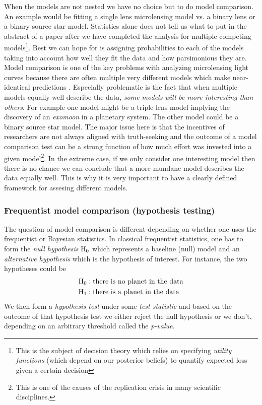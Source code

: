 \documentclass[12pt,dvipsnames]{report}
\begin{document}
When the models are not nested we have no choice but to do model comparison. 
An example would be fitting a single lens microlensing model vs. a binary lens 
or a binary source star model. Statistics alone does not tell us what to put in the 
abstract of a paper after we have completed the analysis for multiple competing 
models\footnote{This is the subject of decision theory which relies on 
specifying \textsl{utility functions} (which depend on our posterior beliefs) 
to quantify expected loss given a certain decision}. Best we can hope for is 
assigning probabilities to each of the models taking into account how well they 
fit the data and how parsimonious they are. Model 
comparison is one of the key problems with analyzing microlensing light curves 
because there are often multiple very different models which make near-identical 
predictions  
\citep[see][for examples from microlensing]{ 2017AJ....153..129J,2020AJ....160...17H,2021AJ....162...59R}.
Especially problematic is the fact that when multiple models equally well 
describe the data, \emph{some models will be more interesting than others}.
For example one model might be a triple lens model implying the discovery of 
an \textsl{exomoon} in a planetary system. The other model could be a binary 
source star model. The major issue here is that the incentives of researchers 
are not always aligned with truth-seeking and the outcome of a model 
comparison test can be a strong function of how much effort was invested into 
a given model\footnote{This is one of the causes of the replication crisis in 
many scientific disciplines.}. In the extreme case, if we only consider one interesting model then
there is no chance we can conclude that  a more mundane model describes the 
data equally well. This is why it is very important to have a clearly defined 
framework for assesing different models.

\subsubsection{Frequentist model comparison (hypothesis testing)}
The question of model comparison is different depending on whether
one uses the frequentist or Bayesian statistics. In classical frequentist
statistics, one has to form the \textsl{null hypothesis} $\textrm H_0$ which 
represents a baseline (null) model and an \textsl{alternative hypothesis} which is 
the hypothesis of interest. For instance, the two hypotheses could be
\begin{align}
    \textrm H_0: & \; \textrm{there is no planet in the data} \notag\\
    \textrm H_1: & \;\textrm{there is a planet in the data}\notag
\end{align}
We then form a \textsl{hypothesis test} under some \textsl{test statistic} 
and based on the outcome of that hypothesis test we either reject the null 
hypothesis or we don't, depending on an arbitrary threshold called the 
\textsl{p-value}.
\end{document}
